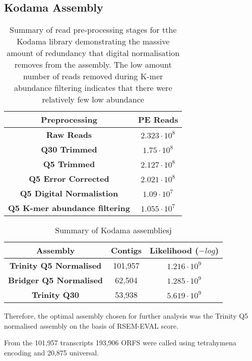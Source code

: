 \subsection{Kodama Assembly}
\begin{table}
    \begin{tabular}{|c|c|}
        \hline
        \textbf{Preprocessing} & \textbf{PE Reads} \\
        \hline
        \textbf{Raw Reads}  & \(2.323\cdot10^{8}\)\\
        \textbf{Q30 Trimmed} & \(1.75\cdot10^{8}\)\\
        \textbf{Q5 Trimmed}  & \(2.127\cdot10^{8} \) \\
        \textbf{Q5 Error Corrected}  & \(2.021\cdot10^{8}\)\\
        \textbf{Q5 Digital Normalistion} & \(1.09 \cdot10^{7}\)\\ 
        \textbf{Q5 K-mer abundance filtering} & \(1.055\cdot10^{7}\)\\
        \hline
    \end{tabular}
    \caption{Summary of read pre-processing stages for tthe Kodama library demonstrating
    the massive amount of redundancy that digital normalisation removes from the assembly.
The low amount number of reads removed during K-mer abundance filtering indicates
that there were relatively few low abundance 
}
    \label{tab:kodama_preproc}
\end{table}

\begin{table}
    \begin{tabular}{|c|c|c|}
        \hline
        \textbf{Assembly} & \textbf{Contigs} & \textbf{Likelihood (\(-log\))}\\
        \hline
        \textbf{Trinity Q5 Normalised}  & 101,957 & \(1.216\cdot10^9\)\\
        \textbf{Bridger Q5 Normalised} & 62,504 & \(1.285\cdot10^9\)\\
        \textbf{Trinity Q30} & 53,938  & \(5.619\cdot10^{9} \) \\
        \hline
    \end{tabular}
    \caption{Summary of Kodama assembliesj}
    \label{tab:kodama_assembly}
\end{table}

Therefore, the optimal assembly chosen for further analysis was the Trinity
Q5 normalised assembly on the basis of RSEM-EVAL score. 

From the 101,957 transcripts 193,906 ORFS were called using tetrahymena 
encoding and 20,875 universal.

